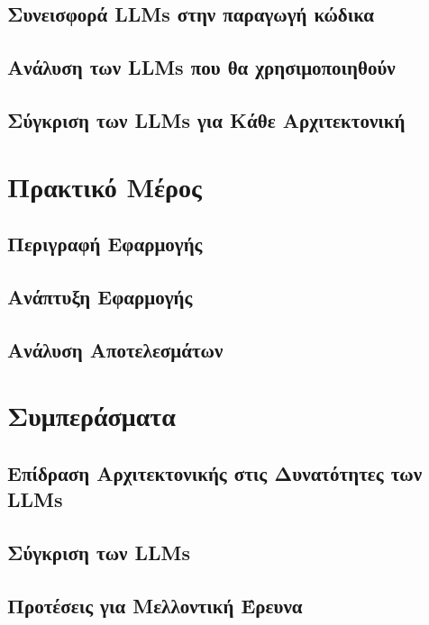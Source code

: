 \documentclass[11pt]{report}
\begin{document}
\section{Συνεισφορά LLMs στην παραγωγή κώδικα}


\section{Ανάλυση των LLMs που θα χρησιμοποιηθούν}


\section{Σύγκριση των LLMs για Κάθε Αρχιτεκτονική}


\chapter{Πρακτικό Μέρος}

\section{Περιγραφή Εφαρμογής}


\section{Ανάπτυξη Εφαρμογής}


\section{Ανάλυση Αποτελεσμάτων}


\chapter{Συμπεράσματα}

\section{Επίδραση Αρχιτεκτονικής στις Δυνατότητες των LLMs}


\section{Σύγκριση των LLMs}


\section{Προτέσεις για Μελλοντική Έρευνα}







\end{document}
